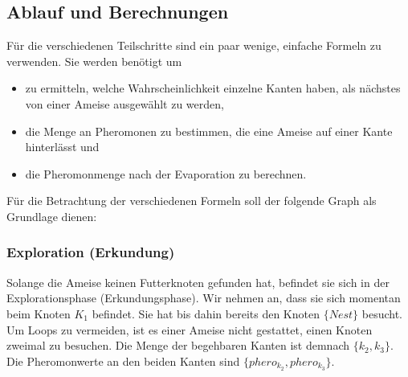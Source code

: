 \subsection{Ablauf und Berechnungen}

Für die verschiedenen Teilschritte sind ein paar wenige, einfache Formeln zu
verwenden. Sie werden benötigt um

\begin{itemize} \item zu ermitteln, welche Wahrscheinlichkeit einzelne Kanten
haben, als nächstes von einer Ameise ausgewählt zu werden, \item die Menge an
Pheromonen zu bestimmen, die eine Ameise auf einer Kante hinterlässt und \item
die Pheromonmenge nach der Evaporation zu berechnen. \end{itemize}

\noindent Für die Betrachtung der verschiedenen Formeln soll der folgende Graph
als Grundlage dienen: \\


\subsubsection*{Exploration (Erkundung)}

Solange die Ameise keinen Futterknoten gefunden hat, befindet sie sich in der
Explorationsphase (Erkundungsphase). Wir nehmen an, dass sie sich momentan beim
Knoten $K_1$ befindet. Sie hat bis dahin bereits den Knoten $\{Nest\}$ besucht.
Um Loops zu vermeiden, ist es einer Ameise nicht gestattet, einen Knoten zweimal
zu besuchen. Die Menge der begehbaren Kanten ist demnach $\{k_2, k_3\}$. Die
Pheromonwerte an den beiden Kanten sind $\{phero_{k_2}, phero_{k_3}\}$.

